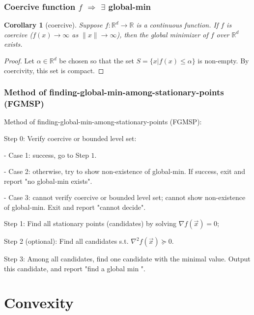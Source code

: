 \documentclass[11pt,a4paper]{article}
\newtheorem{corollary}{Corollary}
\begin{document}
\subsubsection{Coercive function $f$ $\Rightarrow$ $\exists$ global-min}
\begin{corollary}[coercive]
    Suppose $f: \mathbb{R}^{d} \rightarrow \mathbb{R}$ is a continuous function. If $f$ is coercive ($f(x) \rightarrow \infty$ as $\|x\| \rightarrow \infty$), then the global minimizer of $f$ over $\mathbb{R}^{d}$ exists.
\end{corollary}
\begin{proof}
Let $\alpha\in \mathbb{R}^d$ be chosen so that the set $S = \{x |f(x) \leq \alpha\}$ is non-empty. By coercivity,
this set is compact.
\end{proof}


\subsubsection{Method of finding-global-min-among-stationary-points (FGMSP)}
Method of finding-global-min-among-stationary-points (FGMSP):

Step 0: Verify coercive or bounded level set:

- Case 1: success, go to Step $1 .$

- Case 2: otherwise, try to show non-existence of global-min. If success, exit and report "no global-min exists".

- Case 3: cannot verify coercive or bounded level set; cannot show non-existence of global-min. Exit and report "cannot decide".

Step 1: Find all stationary points (candidates) by solving $\nabla f(\vec{x})=0$;

Step 2 (optional): Find all candidates s.t. $\nabla^{2} f(\vec{x}) \succeq 0$.

Step 3: Among all candidates, find one candidate with the minimal value. Output this candidate, and report "find a global $\mathrm{min}$ ".


\section{Convexity}
\end{document}
